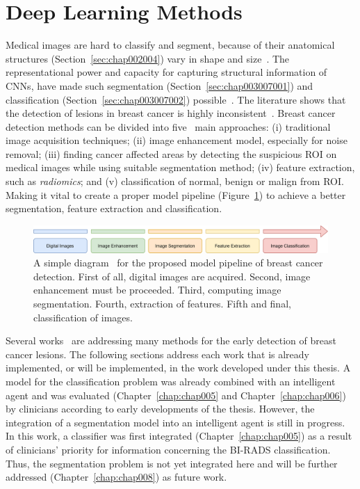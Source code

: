 \section{Deep Learning Methods}
\label{sec:chap003007}

Medical images are hard to classify and segment, because of their anatomical structures (Section~\ref{sec:chap002004}) vary in shape and size~\cite{10.1007/978-3-030-00934-2_99}.
The representational power and capacity for capturing structural information of \acp{CNN}, have made such segmentation (Section~\ref{sec:chap003007001}) and classification (Section~\ref{sec:chap003007002}) possible~\cite{Hou_2016_CVPR, 10.1007/978-3-319-24574-4_28}.
The literature shows that the detection of lesions in breast cancer is highly inconsistent~\cite{shen2019deep, s20143903}.
Breast cancer detection methods can be divided into five~\cite{s20143903} main approaches:
(i) traditional image acquisition techniques;
(ii) image enhancement model, especially for noise removal;
(iii) finding cancer affected areas by detecting the suspicious \ac{ROI} on medical images while using suitable segmentation method;
(iv) feature extraction, such as {\it radiomics}; and
(v) classification of normal, benign or malign from \ac{ROI}.
Making it vital to create a proper model pipeline (Figure~\ref{fig:fig027}) to achieve a better segmentation, feature extraction and classification.

\begin{figure}[htbp]
\centering
\includegraphics[width=\columnwidth]{images/fig027}
\caption{A simple diagram~\cite{s20143903} for the proposed model pipeline of breast cancer detection. First of all, digital images are acquired. Second, image enhancement must be proceeded. Third, computing image segmentation. Fourth, extraction of features. Fifth and final, classification of images.}
\label{fig:fig027}
\end{figure}

Several works~\cite{ammar2015semantically, wang2018support, milosevic2017comparison} are addressing many methods for the early detection of breast cancer lesions.
The following sections address each work that is already implemented, or will be implemented, in the work developed under this thesis.
A model for the classification problem was already combined with an intelligent agent and was evaluated (Chapter~\ref{chap:chap005} and Chapter~\ref{chap:chap006}) by clinicians according to early developments of the thesis.
However, the integration of a segmentation model into an intelligent agent is still in progress.
In this work, a classifier was first integrated (Chapter~\ref{chap:chap005}) as a result of clinicians' priority for information concerning the \ac{BI-RADS} classification.
Thus, the segmentation problem is not yet integrated here and will be further addressed (Chapter~\ref{chap:chap008}) as future work.

